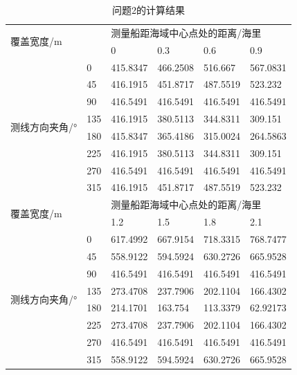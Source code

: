 \documentclass{article}
\begin{document}
\begin{table}[H]
	\centering
	\caption{问题2的计算结果}
	\begin{tabular}{llllll}
		\hline
		\multicolumn{2}{l}{\multirow{2}{*}{覆盖宽度/m}} & \multicolumn{4}{l}{测量船距海域中心点处的距离/海里}      \\
		\multicolumn{2}{l}{}                        & 0        & 0.3      & 0.6      & 0.9      \\ \hline
		\multirow{8}{*}{测线方向夹角/°}       & 0         & 415.8347 & 466.2508 & 516.667  & 567.0831 \\
		& 45        & 416.1915 & 451.8717 & 487.5519 & 523.232  \\
		& 90        & 416.5491 & 416.5491 & 416.5491 & 416.5491 \\
		& 135       & 416.1915 & 380.5113 & 344.8311 & 309.151  \\
		& 180       & 415.8347 & 365.4186 & 315.0024 & 264.5863 \\
		& 225       & 416.1915 & 380.5113 & 344.8311 & 309.151  \\
		& 270       & 416.5491 & 416.5491 & 416.5491 & 416.5491 \\
		& 315       & 416.1915 & 451.8717 & 487.5519 & 523.232  \\ \hline
		\multicolumn{2}{l}{\multirow{2}{*}{覆盖宽度/m}} & \multicolumn{4}{l}{测量船距海域中心点处的距离/海里}      \\
		\multicolumn{2}{l}{}                        & 1.2      & 1.5      & 1.8      & 2.1      \\ \hline
		\multirow{8}{*}{测线方向夹角/°}       & 0         & 617.4992 & 667.9154 & 718.3315 & 768.7477 \\
		& 45        & 558.9122 & 594.5924 & 630.2726 & 665.9528 \\
		& 90        & 416.5491 & 416.5491 & 416.5491 & 416.5491 \\
		& 135       & 273.4708 & 237.7906 & 202.1104 & 166.4302 \\
		& 180       & 214.1701 & 163.754  & 113.3379 & 62.92173 \\
		& 225       & 273.4708 & 237.7906 & 202.1104 & 166.4302 \\
		& 270       & 416.5491 & 416.5491 & 416.5491 & 416.5491 \\
		& 315       & 558.9122 & 594.5924 & 630.2726 & 665.9528 \\ \hline
	\end{tabular}
\end{table}
	
\end{document}
